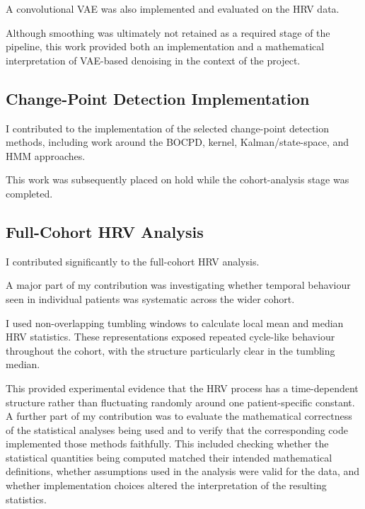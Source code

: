 \documentclass[11pt,a4paper]{article}
\begin{document}
A convolutional VAE was also implemented and evaluated on the HRV data.

Although smoothing was ultimately not retained as a required stage of the
pipeline, this work provided both an implementation and a mathematical
interpretation of VAE-based denoising in the context of the project.

\subsection{Change-Point Detection Implementation}

I contributed to the implementation of the selected change-point detection
methods, including work around the BOCPD, kernel, Kalman/state-space, and HMM
approaches.

This work was subsequently placed on hold while the cohort-analysis stage was
completed.

\subsection{Full-Cohort HRV Analysis}

I contributed significantly to the full-cohort HRV analysis.

A major part of my contribution was investigating whether temporal behaviour
seen in individual patients was systematic across the wider cohort.

I used non-overlapping tumbling windows to calculate local mean and median HRV
statistics. These representations exposed repeated cycle-like behaviour
throughout the cohort, with the structure particularly clear in the tumbling
median.

This provided experimental evidence that the HRV process has a time-dependent
structure rather than fluctuating randomly around one patient-specific
constant.
A further part of my contribution was to evaluate the mathematical correctness of the statistical analyses being used and to verify that the corresponding code implemented those methods faithfully. This included checking whether the statistical quantities being computed matched their intended mathematical definitions, whether assumptions used in the analysis were valid for the data, and whether implementation choices altered the interpretation of the resulting statistics.
\end{document}
